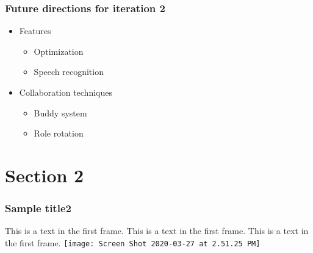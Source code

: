 \documentclass{beamer}
\begin{document}
  \begin{frame}
  \frametitle{Future directions for iteration 2}
  \begin{itemize}
   \item Features
    \begin{itemize}
     \item Optimization
     \item Speech recognition
    \end{itemize}
   \item Collaboration techniques
    \begin{itemize}
     \item Buddy system
     \item Role rotation
    \end{itemize}
  \end{itemize}
  \end{frame}



\section{Section 2}
\begin{frame}
\frametitle{Sample title2}
This is a text in the first frame. This is a text in the first frame. This is a text in the first frame.
\texttt{[image: Screen Shot 2020-03-27 at 2.51.25 PM]}
\end{frame}

  
\end{document}
